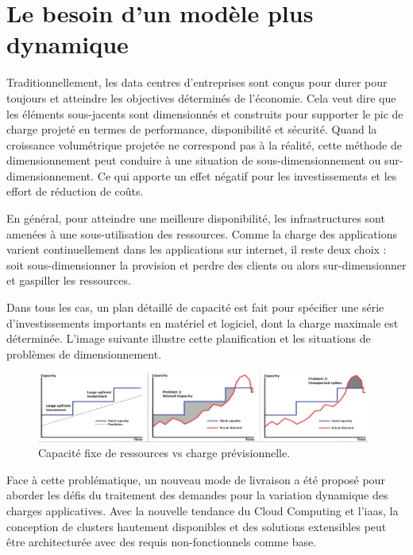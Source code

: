 \section{Le besoin d'un modèle plus dynamique}


Traditionnellement, les data centres d'entreprises sont conçus pour durer pour toujours et atteindre les objectives déterminés de l'économie. Cela veut dire que les éléments sous-jacents sont dimensionnés et construits pour supporter le pic de charge projeté en termes de performance, disponibilité et sécurité. Quand la croissance volumétrique projetée ne correspond pas à la réalité, cette méthode de dimensionnement peut conduire à une situation de sous-dimensionnement ou sur-dimensionnement. Ce qui apporte un effet négatif pour les investissements et les effort de réduction de coûts.

En général, pour atteindre une meilleure disponibilité, les infrastructures sont amenées à une sous-utilisation des ressources. Comme la charge des applications varient continuellement dans les applications sur internet, il reste deux choix : soit sous-dimensionner la provision et perdre des clients ou alors sur-dimensionner et gaspiller les ressources. 

Dans tous les cas, un plan détaillé de capacité est fait pour spécifier une série d'investissements importants en matériel et logiciel, dont la charge maximale est déterminée. L'image suivante illustre cette planification et les situations de problèmes de dimensionnement.


\begin{figure}[h]
\begin{center}
\includegraphics[width=0.98\textwidth]{images/fixed_capacity_load_prediction} 
\caption{Capacité fixe de ressources vs charge prévisionnelle. \cite{awsScaling}}
\end{center}
\end{figure}

Face à cette problématique, un nouveau mode de livraison a été proposé pour aborder les défis du traitement des demandes pour la variation dynamique des charges applicatives. Avec la nouvelle tendance du Cloud Computing et l'\gls{iaas}, la conception de \glspl{cluster} hautement disponibles et des solutions extensibles peut être architecturée avec des requis non-fonctionnels comme base. 

